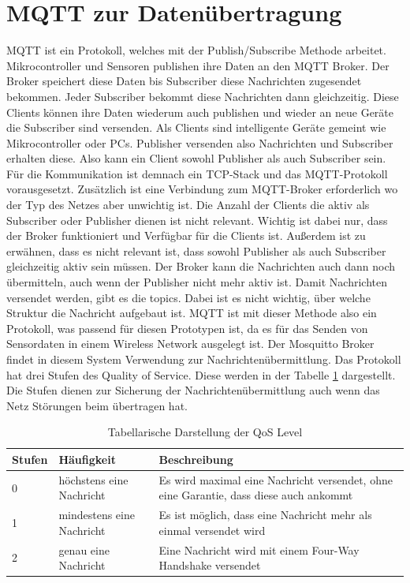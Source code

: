 \section{MQTT zur Datenübertragung}
MQTT ist ein Protokoll, welches mit der Publish/Subscribe Methode arbeitet. Mikrocontroller und Sensoren publishen ihre Daten an den MQTT Broker. Der Broker speichert diese Daten bis Subscriber diese Nachrichten zugesendet bekommen. Jeder Subscriber bekommt diese Nachrichten dann gleichzeitig. Diese Clients können ihre Daten wiederum auch publishen und wieder an neue Geräte die Subscriber sind versenden. Als Clients sind intelligente Geräte gemeint wie Mikrocontroller oder PCs. Publisher versenden also Nachrichten und Subscriber erhalten diese. Also kann ein Client sowohl Publisher als auch Subscriber sein. \citep{soni2017survey} Für die Kommunikation ist demnach ein TCP-Stack und das MQTT-Protokoll vorausgesetzt. Zusätzlich ist eine Verbindung zum MQTT-Broker erforderlich wo der Typ des Netzes aber unwichtig ist. Die Anzahl der Clients die aktiv als Subscriber oder Publisher dienen ist nicht relevant. Wichtig ist dabei nur, dass der Broker funktioniert und Verfügbar für die Clients ist. Außerdem ist zu erwähnen, dass es nicht relevant ist, dass sowohl Publisher als auch Subscriber gleichzeitig aktiv sein müssen. Der Broker kann die Nachrichten auch dann noch übermitteln, auch wenn der Publisher nicht mehr aktiv ist. Damit Nachrichten versendet werden, gibt es die topics. Dabei ist es nicht wichtig, über welche Struktur die Nachricht aufgebaut ist. \citep{Trojan2017}
\newline
MQTT ist mit dieser Methode also ein Protokoll, was passend für diesen Prototypen ist, da es für das Senden von Sensordaten in einem Wireless Network ausgelegt ist. Der Mosquitto Broker findet in diesem System Verwendung zur Nachrichtenübermittlung. 
\newline
\newline
Das Protokoll hat drei Stufen des Quality of Service. Diese werden in der Tabelle \ref{tab:tableqos} dargestellt. Die Stufen dienen zur Sicherung der Nachrichtenübermittlung auch wenn das Netz Störungen beim übertragen hat.

\begin{table}[H]
	\centering
	\caption[Tabellarische Darstellung der QoS Level]{Tabellarische Darstellung der QoS Level \citep{soni2017survey}}
		\vspace{1.0em}	
	\begin{tabular}{| l | l | p{5cm}|}
		\hline
		\rowcolor[gray]{0.9}\textbf{Stufen} & \textbf{Häufigkeit} & \textbf{Beschreibung} \\
		\hline
		\hline
		0 & höchstens eine Nachricht & Es wird maximal eine Nachricht versendet, ohne eine Garantie, dass diese auch ankommt \\
		\hline
		1 & mindestens eine Nachricht & Es ist möglich, dass eine Nachricht mehr als einmal versendet wird\\
		\hline
		2 & genau eine Nachricht & Eine Nachricht wird mit einem Four-Way Handshake versendet\\
		\hline
	\end{tabular}
	\label{tab:tableqos}
\end{table}

